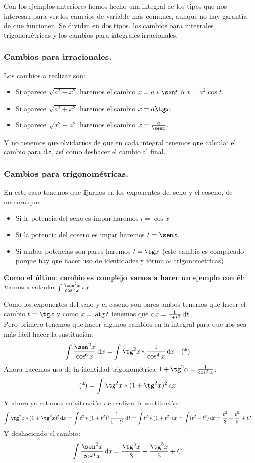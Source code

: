 \documentclass[a4paper,11pt,answers]{exam}
\begin{document}
Con los ejemplos anteriores hemos hecho una integral de los tipos que nos interesan para ver los cambios de variable más comunes, aunque no hay garantía de que funcionen. Se dividen en dos tipos, los cambios para integrales trigonométricas y los cambios para integrales irracionales.
\subsubsection{Cambios para irracionales.}
Los cambios a realizar son:
\begin{itemize}
	 \item Si aparece $\sqrt{a^2 -x^2}$ haremos el cambio $x = a*\sen t$ ó $x=a^2\cos t$.
	 \item Si aparece $\sqrt{a^2 + x^2}$ haremos el cambio $x=a\tg x$.
	 \item Si aparece $\sqrt{x^2 - a^2}$ haremos el cambio $x=\frac{a}{\sen x}$.
\end{itemize}
Y no tenemos que olvidarnos de que en cada integral tenemos que calcular el cambio para $\mathrm{d}x$, así como deshacer el cambio al final.
\subsubsection{Cambios para trigonométricas.}
En este caso tenemos que fijarnos en los exponentes del seno y el coseno, de manera que:
\begin{itemize}
	\item Si la potencia del seno es impar haremos $t = \cos x$.
	\item Si la potencia del coseno es impar haremos $t = \sen x$.
	\item Si ambas potencias son pares haremos $t = \tg x$ (este cambio es complicado porque hay que hacer uso de identidades y fórmulas trigonométricas) 
\end{itemize}
\textbf{Como el último cambio es complejo vamos a hacer un ejemplo con él}:\\
Vamos a calcular $\integral{\frac{\sen^2 x}{\cos^6 x}}{x}$
\begin{solution}
Como los exponentes del seno y el coseno son pares ambos tenemos que hacer el cambio $t = \tg x$ y como $x = \,\mathrm{atg}\, t$ tenemos que $\mathrm{d}x = \frac{1}{1+t^2}\,\mathrm{d}t$\\
Pero primero tenemos que hacer algunos cambios en la integral para que nos sea más fácil hacer la sustitución:
\[\integral{\frac{\sen^2 x}{\cos^6 x}}{x} =\integral{\tg^2 x *\frac{1}{\cos^4 x}}{x}\quad\text{(*)}\]
Ahora hacemos uso de la identidad trigonométrica $1 + \tg^2 \alpha = \frac{1}{\cos^2 \alpha}$:
\[\text{(*)} = \integral{\tg^2 x *(1 + \tg^2 x)^2}{x}\]
Y ahora ya estamos en situación de realizar la sustitución:
\[\integral{\tg^2 x *(1 + \tg^2 x)^2}{x} = \integral{t^2 *(1 + t^2)^2\frac{1}{1+t^2}}{t} =\integral{t^2*(1+t^2)}{t} =
\integral{(t^2 + t^4)}{t} = \frac{t^3}{3} + \frac{t^5}{5} + C\]
Y deshaciendo el cambio:
\[\integral{\frac{\sen^2 x}{\cos^6 x}}{x} = \frac{\tg^3 x}{3} + \frac{\tg^5 x}{5} + C\]
\end{solution}
\end{document}
